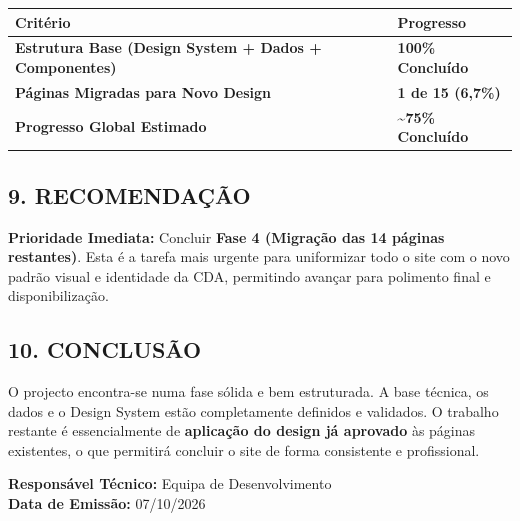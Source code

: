 {\def\LTcaptype{none} %
\begin{longtable}[]{@{}
  >{\raggedright\arraybackslash}p{}
  >{\raggedright\arraybackslash}p{}@{}}
\toprule\noalign{}
\begin{minipage}[b]{\linewidth}\raggedright
Critério
\end{minipage} & \begin{minipage}[b]{\linewidth}\raggedright
Progresso
\end{minipage} \\
\midrule\noalign{}
\endhead
\bottomrule\noalign{}
\endlastfoot
\textbf{Estrutura Base (Design System + Dados + Componentes)} &
\textbf{100\% Concluído} \\
\textbf{Páginas Migradas para Novo Design} & \textbf{1 de 15 (6,7\%)} \\
\textbf{Progresso Global Estimado} & \textbf{\textasciitilde75\%
Concluído} \\
\end{longtable}
}

\subsection{9. RECOMENDAÇÃO}\label{recomendauxe7uxe3o}

\textbf{Prioridade Imediata:} Concluir \textbf{Fase 4 (Migração das 14
páginas restantes)}. Esta é a tarefa mais urgente para uniformizar todo
o site com o novo padrão visual e identidade da CDA, permitindo avançar
para polimento final e disponibilização.

\subsection{10. CONCLUSÃO}\label{conclusuxe3o}

O projecto encontra-se numa fase sólida e bem estruturada. A base
técnica, os dados e o Design System estão completamente definidos e
validados. O trabalho restante é essencialmente de \textbf{aplicação do
design já aprovado} às páginas existentes, o que permitirá concluir o
site de forma consistente e profissional.

\textbf{Responsável Técnico:} Equipa de Desenvolvimento\\
\textbf{Data de Emissão:} 07/10/2026
